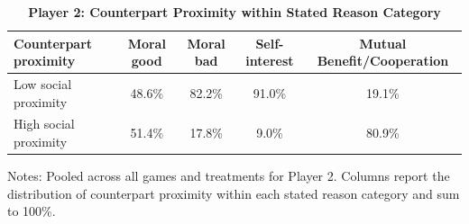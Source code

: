\begin{table}[!htbp]
\centering
\caption{\textbf{Player 2: Counterpart Proximity within Stated Reason Category}}
\label{tab:player2_sp_by_category}
\begin{tabular}{lcccc}
\toprule
Counterpart proximity & Moral good & Moral bad & Self-interest & Mutual Benefit/Cooperation \\
\midrule
Low social proximity & 48.6\% & 82.2\% & 91.0\% & 19.1\% \\
High social proximity & 51.4\% & 17.8\% & 9.0\% & 80.9\% \\
\bottomrule
\end{tabular}
\begin{flushleft}
\footnotesize Notes: Pooled across all games and treatments for Player 2. Columns report the distribution of counterpart proximity within each stated reason category and sum to 100\%.
\end{flushleft}
\end{table}
